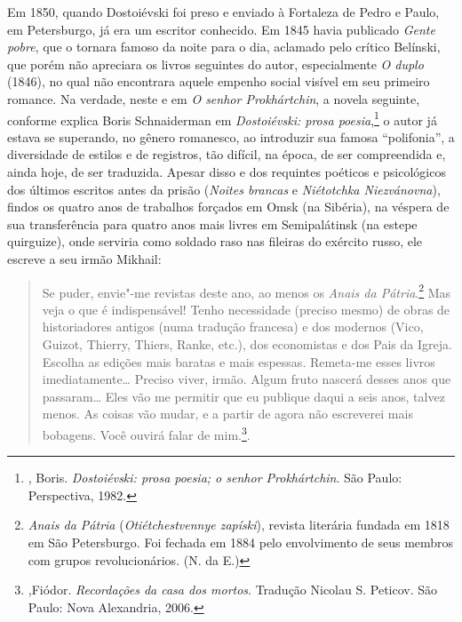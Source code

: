 Em 1850, quando Dostoiévski foi preso e enviado à Fortaleza de
Pedro e Paulo, em Petersburgo, já era um escritor conhecido. Em
1845 havia publicado \emph{Gente pobre}, que o tornara famoso
da noite para o dia, aclamado pelo crítico Belínski, que porém
não apreciara os livros seguintes do autor, especialmente \emph{O
duplo} (1846), no qual não encontrara aquele empenho social
visível em seu primeiro romance. Na verdade, neste e em
\emph{O senhor Prokhártchin}, a novela seguinte, conforme
explica Boris Schnaiderman em \emph{Dostoiévski:
prosa poesia},\footnote{, Boris.
\emph{Dostoiévski: prosa poesia; o senhor Prokhártchin}.
São Paulo: Perspectiva, 1982.} o autor já estava se superando,
no gênero romanesco, ao introduzir sua famosa ``polifonia'', a
diversidade de estilos e de registros, tão difícil, na época,
de ser compreendida e, ainda hoje, de ser traduzida. Apesar
disso e dos requintes poéticos e psicológicos dos últimos
escritos antes da prisão (\emph{Noites brancas} e
\emph{Niétotchka Niezvánovna}), findos os quatro anos de
trabalhos forçados em Omsk (na Sibéria), na véspera de
sua transferência para quatro anos mais livres em
Semipalátinsk (na estepe quirguize), onde serviria como soldado
raso nas fileiras do exército russo, ele escreve a seu irmão
Mikhail: 

\begin{quote}
Se puder, envie"-me revistas deste ano, ao menos os \emph{Anais da Pátria}.\footnote{\emph{Anais da Pátria} (\emph{Otiétchestvennye zapíski}), revista literária fundada em 1818 em São Petersburgo. Foi fechada em 1884 pelo envolvimento de seus membros com grupos revolucionários. (N. da E.)} Mas veja o que é indispensável! Tenho necessidade (preciso mesmo) de obras de historiadores antigos (numa tradução francesa) e dos modernos (Vico, Guizot, Thierry, Thiers, Ranke, etc.), dos economistas e dos Pais da Igreja. Escolha as edições mais baratas e mais espessas. Remeta-me esses livros imediatamente\ldots{} Preciso
viver, irmão. Algum fruto nascerá desses anos que passaram\ldots{} Eles vão me permitir que eu publique daqui a seis anos, talvez menos. As coisas vão mudar, e a partir de agora não escreverei mais bobagens. Você ouvirá falar de mim.\footnote{,Fiódor. \emph{Recordações da casa dos mortos}. Tradução Nicolau S. Peticov. São Paulo: Nova Alexandria, 2006.}. 
\end{quote}

